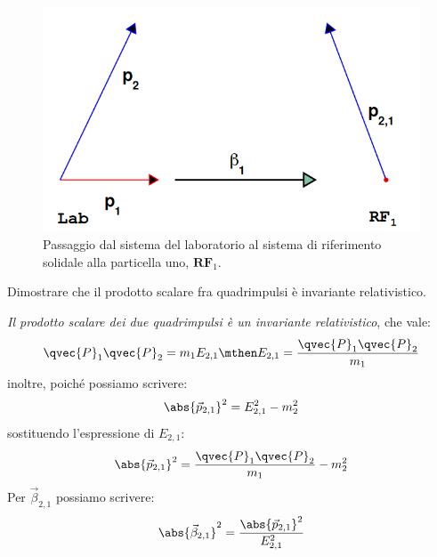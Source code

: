 \begin{figure}[ht]
	\centering
	\includegraphics[scale=0.35]{./img/2020_03_20/relativity_lectures_1.png}
	\caption{Passaggio dal sistema del laboratorio al sistema di riferimento
		solidale alla particella uno, $\textbf{RF}_1$.}
\end{figure}

\begin{exercise}[]
	Dimostrare che il prodotto scalare fra quadrimpulsi è invariante
	relativistico.
\end{exercise}

\textit{Il prodotto scalare dei due quadrimpulsi è un invariante
	relativistico}, che vale:
\begin{equation}
	\qvec{P}_1 \qvec{P}_2 = m_1 E_{2,1}
	\mthen
	E_{2,1} = \frac{\qvec{P}_1 \qvec{P}_2}{m_1}
\end{equation}
inoltre, poiché possiamo scrivere:
\begin{equation}
	\abs{\vec{p}_{2,1}}^2 = E^2_{2,1} - m_2^2
\end{equation}
sostituendo l'espressione di $E _{2,1}$:
\begin{equation}
  \abs{\vec{p}_{2,1}}^2 = \frac{\qvec{P}_{1} \qvec{P}_{2}}{m_1} - m_2^2
\end{equation}
Per $\vec{\beta}_{2,1}$ possiamo scrivere:
\begin{equation}
  \abs{\vec{\beta}_{2,1}}^{2} = \frac{\abs{\vec{p}_{2,1}}^{2}}{E _{2,1}^{2}}
\end{equation}

